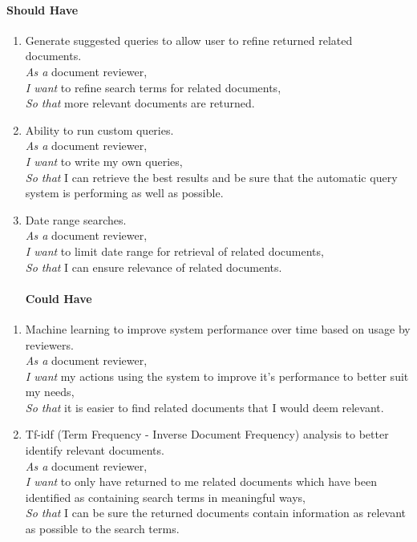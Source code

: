 \documentclass{l4proj}
\begin{document}
\paragraph{Should Have}
\begin{enumerate}[label=\textbf{S.\arabic*}]
\paragraph{Should Have}
\item Generate suggested queries to allow user to refine returned related documents. \\
\textit{As a} document reviewer, \\
\textit{I want} to refine search terms for related documents, \\
\textit{So that} more relevant documents are returned.

\item Ability to run custom queries. \\
\textit{As a} document reviewer, \\
\textit{I want} to write my own queries, \\
\textit{So that} I can retrieve the best results and be sure that the automatic query system is performing as well as possible.

\item Date range searches. \\
\textit{As a} document reviewer, \\
\textit{I want} to limit date range for retrieval of related documents, \\
\textit{So that} I can ensure relevance of related documents.

\paragraph{Could Have}
\end{enumerate}
\begin{enumerate}[label=\textbf{C.\arabic*}]
\item Machine learning to improve system performance over time based on usage by reviewers. \\
\textit{As a} document reviewer, \\
\textit{I want} my actions using the system to improve it’s performance to better suit my needs, \\
\textit{So that} it is easier to find related documents that I would deem relevant.
\item Tf-idf (Term Frequency - Inverse Document Frequency) analysis to better identify relevant documents. \\
\textit{As a} document reviewer, \\
\textit{I want} to only have returned to me related documents which have been identified as containing search terms in meaningful ways, \\
\textit{So that} I can be sure the returned documents contain information as relevant as possible to the search terms.
\end{enumerate}
\end{document}
